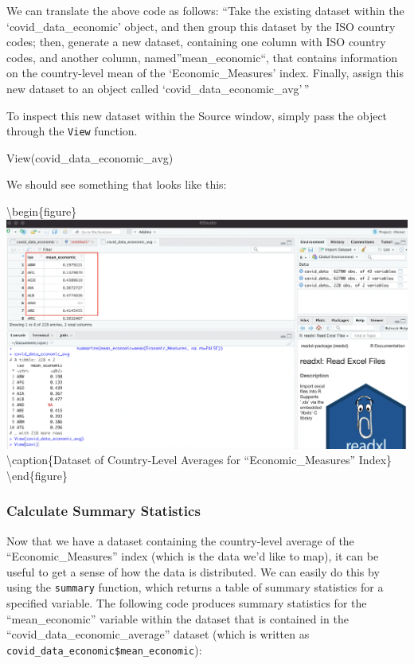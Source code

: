 \documentclass[
]{article}
\newenvironment{Shaded}{\begin{snugshade}}{\end{snugshade}}
\newcommand{\FunctionTok}[1]{\textcolor[rgb]{0.00,0.00,0.00}{#1}}
\newcommand{\NormalTok}[1]{#1}
\begin{document}
We can translate the above code as follows: ``Take the existing dataset within the `covid\_data\_economic' object, and then group this dataset by the ISO country codes; then, generate a new dataset, containing one column with ISO country codes, and another column, named''mean\_economic``, that contains information on the country-level mean of the `Economic\_Measures' index. Finally, assign this new dataset to an object called `covid\_data\_economic\_avg'\,''

To inspect this new dataset within the Source window, simply pass the object through the \texttt{View} function.

\begin{Shaded}
\begin{Highlighting}[]
\FunctionTok{View}\NormalTok{(covid\_data\_economic\_avg)}
\end{Highlighting}
\end{Shaded}

We should see something that looks like this:

\textbackslash begin\{figure\}
\includegraphics[width=1\linewidth]{images/mean_economic} \textbackslash caption\{Dataset of Country-Level Averages for ``Economic\_Measures'' Index\}\label{fig:unnamed-chunk-37}
\textbackslash end\{figure\}

\hypertarget{calculate-summary-statistics}{%
\subsubsection{Calculate Summary Statistics}\label{calculate-summary-statistics}}

Now that we have a dataset containing the country-level average of the ``Economic\_Measures'' index (which is the data we'd like to map), it can be useful to get a sense of how the data is distributed. We can easily do this by using the \texttt{summary} function, which returns a table of summary statistics for a specified variable. The following code produces summary statistics for the ``mean\_economic'' variable within the dataset that is contained in the ``covid\_data\_economic\_average'' dataset (which is written as \texttt{covid\_data\_economic\$mean\_economic}):
\end{document}

